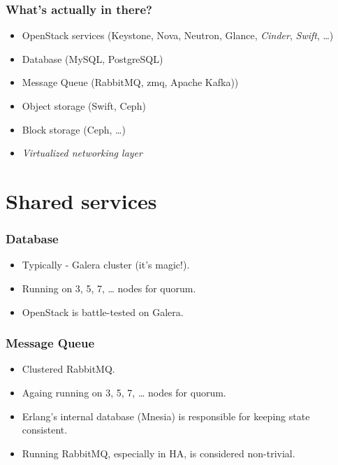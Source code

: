 \documentclass[aspectratio=169]{beamer}
\begin{document}
\begin{frame}
    \frametitle{What's actually in there?}
    \begin{center}
        \begin{itemize}
            \pause
            \item OpenStack services (Keystone, Nova, Neutron, Glance, \emph{Cinder}, \emph{Swift}, …)
            \pause
            \item Database (MySQL, PostgreSQL)
            \pause
            \item Message Queue (RabbitMQ, zmq, Apache Kafka))
            \pause
            \item Object storage (Swift, Ceph)
            \pause
            \item Block storage (Ceph, …)
            \pause
            \item \emph{Virtualized networking layer}
        \end{itemize}
    \end{center}
\end{frame}

\section{Shared services}

\begin{frame}
    \frametitle{Database}
    \begin{center}
        \begin{itemize}
            \item Typically - Galera cluster (it's magic!).
            \item Running on 3, 5, 7, … nodes for quorum.
            \item OpenStack is battle-tested on Galera.
        \end{itemize}
    \end{center}
\end{frame}

\begin{frame}
    \frametitle{Message Queue}
    \begin{center}
        \begin{itemize}
            \item Clustered RabbitMQ.
            \item Againg running on 3, 5, 7, … nodes for quorum.
            \item Erlang's internal database (Mnesia) is responsible for keeping state consistent.
            \item Running RabbitMQ, especially in HA, is considered non-trivial.
        \end{itemize}
    \end{center}
\end{frame}
\end{document}
